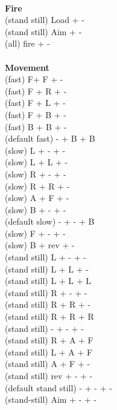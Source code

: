 \ \\ {\bf Fire } \\
(stand still) Load + - \\
(stand still) Aim + - \\
(all) fire + - \\
\ \\ {\bf Movement } \\
(fast) F+ F + - \\
(fast) F + R + - \\
(fast) F + L + - \\
(fast) F + B + - \\
(fast) B + B + - \\
(default fast) - + B + B \\
(slow) L + - + - \\
(slow) L + L + - \\
(slow) R + - + - \\
(slow) R + R + - \\
(slow) A + F + - \\
(slow) B + - + - \\
(default slow)  - + - + B \\
(slow) F + - + - \\
(slow) B + rev + - \\
(stand still) L + - + - \\
(stand still) L + L + - \\
(stand still) L + L + L \\
(stand still) R + - + - \\
(stand still) R + R + - \\
(stand still) R + R + R \\
(stand still) - + - + - \\
(stand still) R + A + F \\
(stand still) L + A + F \\
(stand still) A + F + - \\
(stand still) rev + - + - \\
(default stand still) - + - + - \\
(stand-still) Aim + - + - \\



